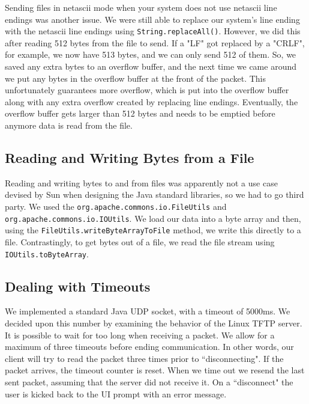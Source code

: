 \documentclass[12pt]{article}
\begin{document}
	Sending files in netascii mode when your system does not use netascii line endings was another issue. We were still able to replace our system's line ending with the netascii line endings using \lstinline|String.replaceAll()|. However, we did this after reading 512 bytes from the file to send. If a "LF" got replaced by a "CRLF", for example, we now have 513 bytes, and we can only send 512 of them. So, we saved any extra bytes to an overflow buffer, and the next time we came around we put any bytes in the overflow buffer at the front of the packet. This unfortunately guarantees more overflow, which is put into the overflow buffer along with any extra overflow created by replacing line endings. Eventually, the overflow buffer gets larger than 512 bytes and needs to be emptied before anymore data is read from the file. 
	
	\subsection{Reading and Writing Bytes from a File}
	
	Reading and writing bytes to and from files was apparently not a use case devised by Sun when designing the Java standard libraries, so we had to go third party. We used the \mbox{\lstinline|org.apache.commons.io.FileUtils|} and \lstinline|org.apache.commons.io.IOUtils|. We load our data into a byte array and then, using the \lstinline|FileUtils.writeByteArrayToFile| method, we write this directly to a file. Contrastingly, to get bytes out of a file, we read the file stream using \lstinline|IOUtils.toByteArray|.
	
	\subsection{Dealing with Timeouts}
	
	We implemented a standard Java UDP socket, with a timeout of 5000ms. We decided upon this number by examining the behavior of the Linux TFTP server. It is possible to wait for too long when receiving a packet. We allow for a maximum of three timeouts before ending communication. In other words, our client will try to read the packet three times prior to ``disconnecting". If the packet arrives, the timeout counter is reset. When we time out we resend the last sent packet, assuming that the server did not receive it. On a ``disconnect" the user is kicked back to the UI prompt with an error message.
	
	
	
\end{document}
